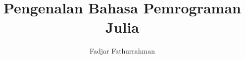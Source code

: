 \documentclass[a4paper,12pt,fleqn,bahasa]{extbook}
\begin{document}
\title{Pengenalan Bahasa Pemrograman Julia}
\author{Fadjar Fathurrahman}
\date{}
\maketitle

\tableofcontents


\end{document}
